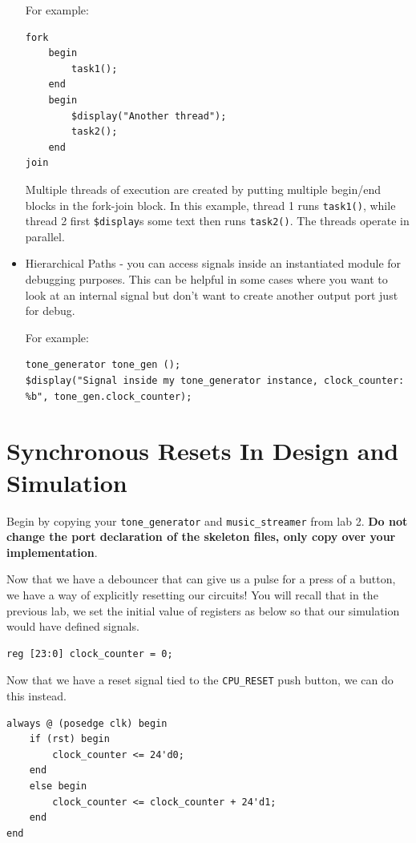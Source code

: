 \documentclass[11pt]{article}
\begin{document}
\begin{itemize}
For example:
\begin{verbatim}
fork
	begin
		task1();
	end
	begin
		$display("Another thread");
		task2();
	end
join
\end{verbatim}

Multiple threads of execution are created by putting multiple begin/end blocks in the fork-join block. In this example, thread 1 runs \verb|task1()|, while thread 2 first \verb|$display|s some text then runs \verb|task2()|. The threads operate in parallel.

\item Hierarchical Paths - you can access signals inside an instantiated module for debugging purposes. This can be helpful in some cases where you want to look at an internal signal but don't want to create another output port just for debug.

For example:
\begin{verbatim}
tone_generator tone_gen ();
$display("Signal inside my tone_generator instance, clock_counter: %b", tone_gen.clock_counter);
\end{verbatim} 
\end{itemize}

\section{Synchronous Resets In Design and Simulation}
Begin by copying your \verb|tone_generator| and \verb|music_streamer| from lab 2. \textbf{Do not change the port declaration of the skeleton files, only copy over your implementation}.

Now that we have a debouncer that can give us a pulse for a press of a button, we have a way of explicitly resetting our circuits! You will recall that in the previous lab, we set the initial value of registers as below so that our simulation would have defined signals.

\begin{verbatim}
reg [23:0] clock_counter = 0;
\end{verbatim}

Now that we have a reset signal tied to the \verb|CPU_RESET| push button, we can do this instead.

\begin{verbatim}
always @ (posedge clk) begin
	if (rst) begin
		clock_counter <= 24'd0;
	end
	else begin
		clock_counter <= clock_counter + 24'd1;
	end
end
\end{verbatim}
\end{document}
